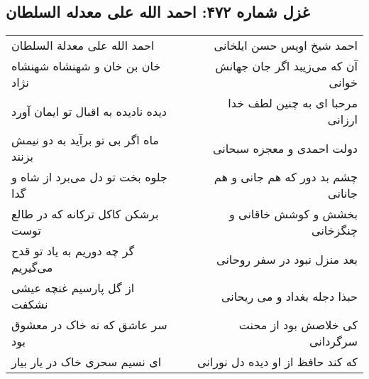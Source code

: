 \begin{center}
\section*{غزل شماره ۴۷۲: احمد الله علی معدله السلطان}
\label{sec:sh472}
\begin{longtable}{l p{0.5cm} r}
احمد الله علی معدلة السلطان
&&
احمد شیخ اویس حسن ایلخانی
\\
خان بن خان و شهنشاه شهنشاه نژاد
&&
آن که می‌زیبد اگر جان جهانش خوانی
\\
دیده نادیده به اقبال تو ایمان آورد
&&
مرحبا ای به چنین لطف خدا ارزانی
\\
ماه اگر بی تو برآید به دو نیمش بزنند
&&
دولت احمدی و معجزه سبحانی
\\
جلوه بخت تو دل می‌برد از شاه و گدا
&&
چشم بد دور که هم جانی و هم جانانی
\\
برشکن کاکل ترکانه که در طالع توست
&&
بخشش و کوشش خاقانی و چنگزخانی
\\
گر چه دوریم به یاد تو قدح می‌گیریم
&&
بعد منزل نبود در سفر روحانی
\\
از گل پارسیم غنچه عیشی نشکفت
&&
حبذا دجله بغداد و می ریحانی
\\
سر عاشق که نه خاک در معشوق بود
&&
کی خلاصش بود از محنت سرگردانی
\\
ای نسیم سحری خاک در یار بیار
&&
که کند حافظ از او دیده دل نورانی
\\
\end{longtable}
\end{center}
